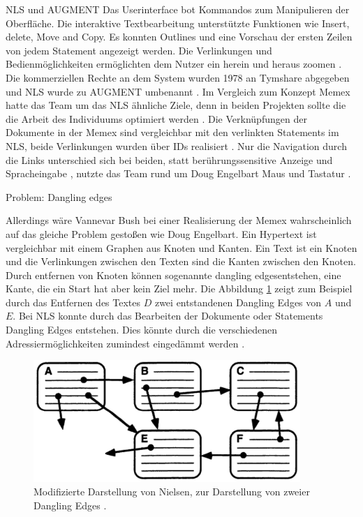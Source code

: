 \begin{section}{NLS und AUGMENT}
Das Userinterface bot Kommandos zum Manipulieren der Oberfläche. Die interaktive Textbearbeitung unterstützte Funktionen wie Insert, delete, Move and Copy. Es konnten Outlines und eine Vorschau der ersten Zeilen von jedem Statement angezeigt werden. Die Verlinkungen und Bedienmöglichkeiten ermöglichten dem Nutzer ein \glqq herein und heraus zoomen \grqq{ }\cite{MotherOfDemo1968}. Die kommerziellen Rechte an dem System wurden 1978 an Tymshare abgegeben und NLS wurde zu AUGMENT umbenannt \cite{Engelbart1984}. Im Vergleich zum Konzept Memex hatte das Team um das NLS ähnliche Ziele, denn in beiden Projekten sollte die die Arbeit des Individuums optimiert werden \cite{Life1945} \cite{MotherOfDemo1968}. Die Verknüpfungen der Dokumente in der Memex sind vergleichbar mit den verlinkten Statements im NLS, beide Verlinkungen wurden über IDs realisiert \cite{Engelbart1984} \cite{Bush1945}. Nur die Navigation durch die Links unterschied sich bei beiden, statt berührungssensitive Anzeige und Spracheingabe \cite{Bush1945}, nutzte das Team rund um Doug Engelbart Maus und Tastatur \cite{MotherOfDemo1968}.

\end{section}

\begin{section}{Problem: Dangling edges}
\label{sec:dangling}

Allerdings wäre Vannevar Bush bei einer Realisierung der Memex wahrscheinlich auf das gleiche Problem gestoßen wie Doug Engelbart. Ein Hypertext ist vergleichbar mit einem Graphen aus Knoten und Kanten. Ein Text ist ein Knoten und die Verlinkungen zwischen den Texten sind die Kanten zwischen den Knoten. Durch entfernen von Knoten können sogenannte \glqq dangling edges\grqq{ }entstehen, eine Kante, die ein Start hat aber kein Ziel mehr. Die Abbildung \ref{fig:dangle} zeigt zum Beispiel durch das Entfernen des Textes $D$ zwei entstandenen Dangling Edges von $A$ und $E$. Bei NLS konnte durch das Bearbeiten der Dokumente oder Statements Dangling Edges entstehen. Dies könnte durch die verschiedenen Adressiermöglichkeiten zumindest eingedämmt werden \cite{Engelbart1984}.

\begin{figure}[H]
	\centering
	\includegraphics[width=0.9\textwidth]{image/dangle}
	\caption{Modifizierte Darstellung von Nielsen, zur Darstellung von zweier Dangling Edges \cite[S.1]{Nielsen1995}.}
	\label{fig:dangle}
\end{figure}

\end{section}

